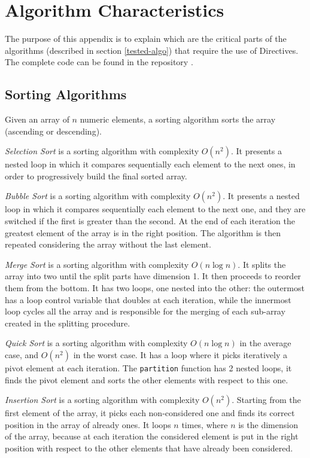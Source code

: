 \chapter{Algorithm Characteristics}
\label{app:algoritmi}

The purpose of this appendix is to explain which are the critical parts of the algorithms
(described in section \ref{tested-algo}) that require the use of Directives. The complete
code can be found in the repository \cite{repo_our_files}.

\section{Sorting Algorithms}

Given an array of $n$ numeric elements, a sorting algorithm sorts the array (ascending or descending).

\bigskip\noindent
\emph{Selection Sort} is a sorting algorithm with complexity $O(n^2)$. It presents a nested loop 
in which it compares sequentially each element to the next ones, in order to progressively build
the final sorted array.

\bigskip \noindent
\emph{Bubble Sort} is a sorting algorithm with complexity $O(n^2)$. It presents a nested loop 
in which it compares sequentially each element to the next one, and they are switched if the first
is greater than the second. At the end of each iteration the greatest element of the array is in the
right position. The algorithm is then repeated considering the array without the last element.

\bigskip \noindent
\emph{Merge Sort} is a sorting algorithm with complexity $O(n\log{n})$. It splits 
the array into two until the split parts have dimension 1. It then proceeds to reorder them
from the bottom. It has two loops, one nested into the other: the outermost has a loop control
variable that doubles at each iteration, while the innermost loop cycles all the array
and is responsible for the merging of each sub-array created in the splitting procedure.

\bigskip \noindent
\emph{Quick Sort} is a sorting algorithm with complexity $O(n\log{n})$ in the average case, and 
$O(n^2)$ in the worst case. It has a loop where it picks iteratively a pivot element at each 
iteration. The \texttt{partition} function has 2 nested loops, it finds the pivot element and 
sorts the other elements with respect to this one.

\bigskip \noindent
\emph{Insertion Sort} is a sorting algorithm with complexity $O(n^2)$. Starting from the first
element of the array, it picks each non-considered one and finds its correct position in the array 
of already ones. It loops $n$ times, where $n$ is the dimension of the array, because at each
iteration the considered element is put in the right position with respect to the other elements
that have already been considered.


